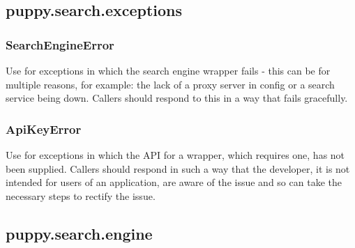 \documentclass[letterpaper,10pt,english]{sphinxmanual}
\begin{document}
\subsection{puppy.search.exceptions}
\label{api2.0:module-puppy.search.exceptions}\label{api2.0:puppy-search-exceptions}

\subsubsection{SearchEngineError}
\label{api2.0:searchengineerror}

\begin{fulllineitems}
\label{api2.0:puppy.search.exceptions.SearchEngineError}
Use for exceptions in which the search engine wrapper fails - this can be for multiple reasons, 
for example: the lack of a proxy server in config or a search service being down. Callers should respond
to this in a way that fails gracefully.

\end{fulllineitems}



\subsubsection{ApiKeyError}
\label{api2.0:apikeyerror}

\begin{fulllineitems}
\label{api2.0:puppy.search.exceptions.ApiKeyError}
Use for exceptions in which the API for a wrapper, which requires one, has not been supplied. Callers should
respond in such a way that the developer, it is not intended for users of an application, are aware of the issue
and so can take the necessary steps to rectify the issue.

\end{fulllineitems}



\subsection{puppy.search.engine}
\label{api2.0:puppy-search-engine}\label{api2.0:module-puppy.search.engine}
\end{document}
